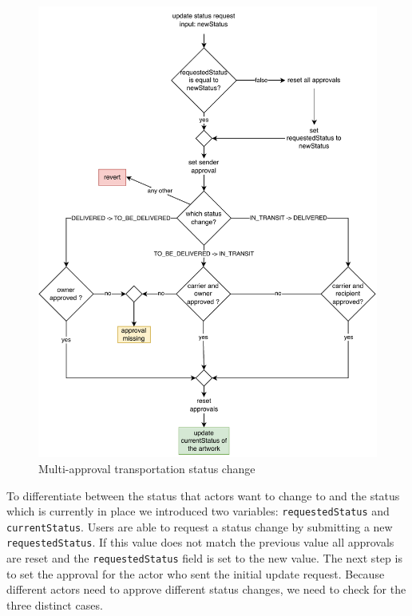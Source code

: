 \begin{figure}[ht]
    \centering
    \includegraphics[height=0.5\textheight, keepaspectratio]{diagrams/update_status.drawio.pdf}
    \caption{Multi-approval transportation status change}
    \label{fig:update_status}
\end{figure}

To differentiate between the status that actors want to change to and the status which is currently in place we introduced two variables: \texttt{requestedStatus} and \texttt{currentStatus}. Users are able to request a status change by submitting a new \texttt{requestedStatus}. If this value does not match the previous value all approvals are reset and the \texttt{requestedStatus} field is set to the new value. The next step is to set the approval for the actor who sent the initial update request. Because different actors need to approve different status changes, we need to check for the three distinct cases.

